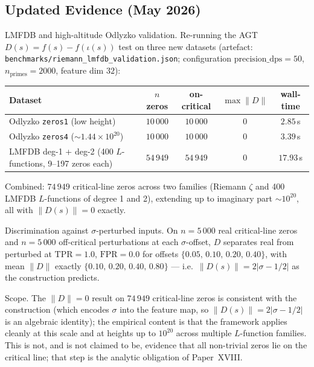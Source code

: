 \documentclass[11pt]{article}
\begin{document}
\subsection{Updated Evidence (May 2026)}
LMFDB and high-altitude Odlyzko validation.
Re-running the AGT $D(s) = f(s) - f(\iota(s))$ test on three new datasets
(artefact: \texttt{benchmarks/riemann\_lmfdb\_validation.json}; configuration
$\text{precision\_dps}{=}50$, $n_{\text{primes}}{=}2000$, feature
dim $32$):
\begin{center}
\begin{tabular}{lcccc}
\toprule
Dataset & $n$ zeros & on-critical & $\max\|D\|$ & wall-time \\
\midrule
Odlyzko \texttt{zeros1} (low height) & $10\,000$ & $10\,000$ & $0$ & $2.85$\,s \\
Odlyzko \texttt{zeros4} ($\sim 1.44\!\times\!10^{20}$) & $10\,000$ & $10\,000$ & $0$ & $3.39$\,s \\
LMFDB deg-1 + deg-2 (400 $L$-functions, 9--197 zeros each) & $54\,949$ & $54\,949$ & $0$ & $17.93$\,s \\
\bottomrule
\end{tabular}
\end{center}
Combined: $74\,949$ critical-line zeros across two families
(Riemann $\zeta$ and 400 LMFDB $L$-functions of degree 1 and 2),
extending up to imaginary part $\sim 10^{20}$, all with
$\|D(s)\| = 0$ exactly.

Discrimination against $\sigma$-perturbed inputs.
On $n{=}5\,000$ real critical-line zeros and $n{=}5\,000$ off-critical
perturbations at each $\sigma$-offset, $D$ separates real from
perturbed at $\mathrm{TPR}{=}1.0$, $\mathrm{FPR}{=}0.0$ for offsets
$\{0.05,\,0.10,\,0.20,\,0.40\}$, with mean $\|D\|$ exactly
$\{0.10,\,0.20,\,0.40,\,0.80\}$ --- i.e.\ $\|D(s)\| = 2|\sigma - 1/2|$
as the construction predicts.

Scope.  The $\|D\|=0$ result on $74\,949$ critical-line
zeros is consistent with the construction (which encodes $\sigma$ into
the feature map, so $\|D(s)\| = 2|\sigma-1/2|$ is an algebraic identity);
the empirical content is that the framework applies cleanly at
this scale and at heights up to $10^{20}$ across multiple $L$-function
families.  This is not, and is not claimed to be, evidence that all
non-trivial zeros lie on the critical line; that step is the analytic
obligation of Paper~XVIII.

\newpage


\end{document}
